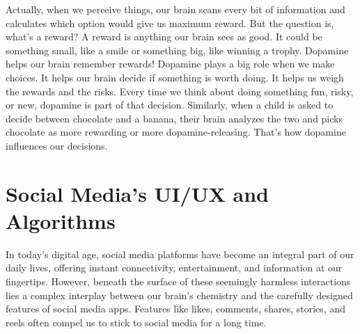 \documentclass[a4paper,10pt,twocolumn]{memoir}
\begin{document}
Actually, when we perceive things, our brain scans every bit of information and calculates which option would give us maximum reward. But the question is, what’s a reward? A reward is anything our brain sees as good. It could be something small, like a smile or something big, like winning a trophy. Dopamine helps our brain remember rewards! Dopamine plays a big role when we make choices. It helps our brain decide if something is worth doing. It helps us weigh the rewards and the risks. Every time we think about doing something fun, risky, or new, dopamine is part of that decision. Similarly, when a child is asked to decide between chocolate and a banana, their brain analyzes the two and picks chocolate as more rewarding or more dopamine-releasing. That’s how dopamine influences our decisions.

\section*{Social Media’s UI/UX and Algorithms}

In today’s digital age, social media platforms have become an integral part of our daily lives, offering instant connectivity, entertainment, and information at our fingertips. However, beneath the surface of these seemingly harmless interactions lies a complex interplay between our brain’s chemistry and the carefully designed features of social media apps. Features like likes, comments, shares, stories, and reels often compel us to stick to social media for a long time.

\end{document}

